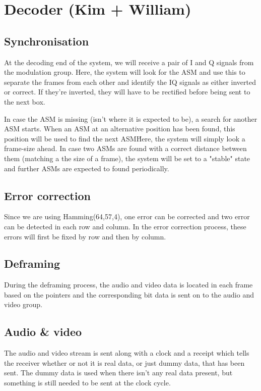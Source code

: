 \section{Decoder (Kim + William)}

\subsection{Synchronisation}
At the decoding end of the system, we will receive a pair of I and Q signals from the modulation group. Here, the system will look for the ASM and use this to separate the frames from each other and identify the IQ signals as either inverted or correct. If they're inverted, they will have to be rectified before being sent to the next box.

In case the ASM is missing (isn't where it is expected to be), a search for another ASM starts.  When an ASM at an alternative position has been found, this position will be used to find the next ASM\. Here, the system will simply look a frame-size ahead. In case two ASMs are found with a correct distance between them (matching a the size of a frame), the system will be set to a "stable" state and further ASMs are expected to found periodically.

\subsection{Error correction}
Since we are using Hamming(64,57,4), one error can be corrected and two error can be detected in each row and column. In the error correction process, these errors will first be fixed by row and then by column.

\subsection{Deframing}
During the deframing process, the audio and video data is located in each frame based on the pointers and the corresponding bit data is sent on to the audio and video group.

\subsection{Audio \& video}
The audio and video stream is sent along with a clock and a receipt which tells the receiver whether or not it is real data, or just dummy data, that has been sent. The dummy data is used when there isn't any real data present, but something is still needed to be sent at the clock cycle.
